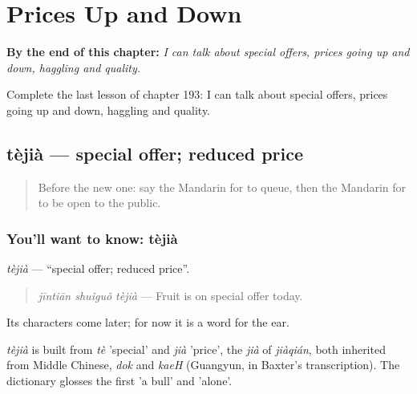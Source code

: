 
\chapter{Prices Up and Down}
\label{ch:zh-prices-up-and-down}

\begin{chapteropening}
\textbf{By the end of this chapter:} \emph{I can talk about special offers, prices going up and down, haggling and quality.}

Complete the last lesson of chapter 193: I can talk about special offers, prices going up and down, haggling and quality.
\end{chapteropening}

\section[tèjià]{tèjià — special offer; reduced price}

\label{lesson:ZH-C193-tejia}



\begin{quote}
Before the new one: say the Mandarin for to queue, then the Mandarin for to be open to the public.
\end{quote}

\subsection*{You'll want to know: tèjià}
\emph{tèjià} — \textquotedblleft{}special offer; reduced price\textquotedblright{}.

\begin{quote}
\emph{jīntiān shuǐguǒ tèjià} — Fruit is on special offer today.
\end{quote}

Its characters come later; for now it is a word for the ear.

\begin{cousinweb}
\emph{tèjià} is built from \emph{tè} 'special' and \emph{jià} 'price', the \emph{jià} of \emph{jiàqián}, both inherited from Middle Chinese, \emph{dok} and \emph{kaeH} (Guangyun, in Baxter's transcription). The dictionary glosses the first 'a bull' and 'alone'.
\end{cousinweb}

